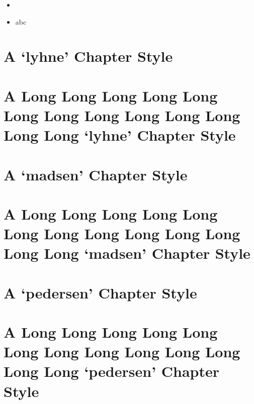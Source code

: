 \documentclass[10pt,a4paper,extrafontsizes,oldfontcommands,oneside]{memoir}
\begin{document}
\begin{itemize}
	\item 
	\item abc
\end{itemize}




\chapter{A `lyhne' Chapter Style} %
\label{chap:a_lyhne_chapter_style}



\chapter{A Long Long Long Long Long Long Long Long Long Long Long Long Long `lyhne' Chapter Style} %
\label{chap:a_long_lyhne_chapter_style}


\chapter{A `madsen' Chapter Style} %
\label{chap:a_madsen_chapter_style}



\chapter{A Long Long Long Long Long Long Long Long Long Long Long Long Long `madsen' Chapter Style} %
\label{chap:a_long_madsen_chapter_style}



\chapter{A `pedersen' Chapter Style} %
\label{chap:a_pedersen_chapter_style}



\chapter{A Long Long Long Long Long Long Long Long Long Long Long Long Long `pedersen' Chapter Style} %
\label{chap:a_long_pedersen_chapter_style}
\end{document}
